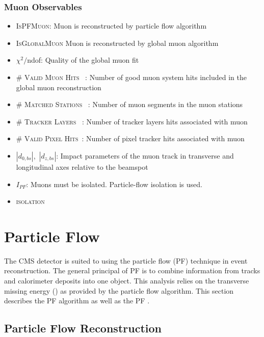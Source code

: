 \subsubsection{Muon Observables}
\begin{itemize}
    \item \textsc{IsPFMuon}: Muon is reconstructed by particle flow algorithm
    \item \textsc{IsGlobalMuon} Muon is reconstructed by global muon algorithm
    \item $\chi^2/$ndof: Quality of the global muon fit
    \item \textsc{\# Valid Muon Hits} ~: Number of good muon system hits included in the global muon reconstruction
    \item \textsc{\# Matched Stations} ~: Number of muon segments in the muon stations
    \item \textsc{\# Tracker Layers} ~: Number of tracker layers hits associated with muon
    \item \textsc{\# Valid Pixel Hits}~: Number of pixel tracker hits associated with muon
    \item $|d_{0,bs}|$,~$|d_{z,bs}|$: Impact parameters of the muon track in transverse and longitudinal axes relative to the beamspot
    \item $I_{PF}$: Muons must be isolated. Particle-flow isolation is used. 
    \item \textsc{isolation}
\end{itemize}


\section{Particle Flow}
The CMS detector is suited to using the particle flow (PF) technique in event reconstruction. The general principal of PF is to combine information from tracks and calorimeter deposits into one object. This analysis relies on the transverse missing energy (\met) as provided by the particle flow algorithm. This section describes the PF algorithm as well as the PF \met. 

\subsection{Particle Flow Reconstruction}
